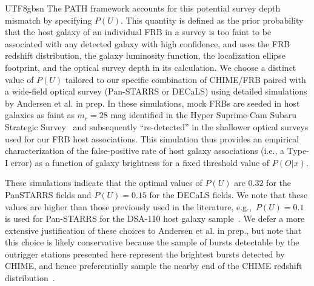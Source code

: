 \documentclass[twocolumn,linenumbers]{aastex631}
\newcommand{\pox}{\ensuremath{P(O|x)}}
\begin{document}
\begin{CJK*}{UTF8}{gbsn}
The PATH framework accounts for this potential survey depth mismatch by specifying $P(U)$. This quantity is defined as the prior probability that the host galaxy of an individual FRB in a survey is too faint to be associated with any detected galaxy with high confidence, and uses the FRB redshift distribution, the galaxy luminosity function, the localization ellipse footprint, and the optical survey depth in its calculation. We choose a distinct value of $P(U)$ tailored to our specific combination of CHIME/FRB paired with a wide-field optical survey (Pan-STARRS or DECaLS) using detailed simulations by Andersen et al. in prep. In these simulations, mock FRBs are seeded in host galaxies as faint as $m_r = 28$ mag identified in the Hyper Suprime-Cam Subaru Strategic Survey~\citep{aihara2018first} and subsequently ``re-detected'' in the shallower optical surveys used for our FRB host associations. 
This simulation thus provides an empirical characterization of the false-positive rate of host galaxy associations (i.e., a Type-I error) as a function of galaxy brightness for a fixed threshold value of $P(O|x)$. 

These simulations indicate that the optimal values of $P(U)$ are $0.32$ for the PanSTARRS fields and $P(U) = 0.15$ for the DECaLS fields. We note that these values are higher than those previously used in 
the literature, e.g.,\ $P(U) = 0.1$ is used for Pan-STARRS for the DSA-110 host galaxy sample~\citep{law2024deep}. %
We defer a more extensive justification of these choices to Andersen et al. in prep., but note that this choice is likely conservative because the sample of bursts detectable by the outrigger stations presented here represent the brightest bursts detected by CHIME, and hence preferentially sample the nearby end of the CHIME redshift distribution~\citep{shin2023inferring}. 


\end{CJK*}
\end{document}
